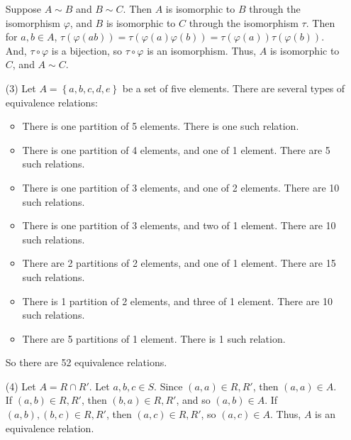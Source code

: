 \documentclass[12pt]{article}
\begin{document}
\begin{itemize}
Suppose $A \sim B$ and $B \sim C$. Then $A$ is isomorphic to $B$ through the isomorphism $\varphi$, and $B$ is isomorphic to $C$ through the isomorphism $\tau$. Then for $a, b \in A$, $\tau(\varphi(ab)) = \tau(\varphi(a)\varphi(b)) = \tau(\varphi(a))\tau(\varphi(b))$. And, $\tau \circ \varphi$ is a bijection, so $\tau \circ \varphi$ is an isomorphism. Thus, $A$ is isomorphic to $C$, and $A \sim C$.
\item[(3)]
Let $A = \left\lbrace a, b, c, d, e \right\rbrace$ be a set of five elements. There are several types of equivalence relations:
\begin{itemize}
\item
There is one partition of 5 elements. There is one such relation.
\item
There is one partition of 4 elements, and one of 1 element. There are 5 such relations.
\item
There is one partition of 3 elements, and one of 2 elements. There are 10 such relations.
\item
There is one partition of 3 elements, and two of 1 element. There are 10 such relations.
\item
There are 2 partitions of 2 elements, and one of 1 element. There are 15 such relations.
\item
There is 1 partition of 2 elements, and three of 1 element. There are 10 such relations.
\item
There are 5 partitions of 1 element. There is 1 such relation.
\end{itemize}
So there are 52 equivalence relations.
\item[(4)]
Let $A = R \cap R'$. Let $a, b, c \in S$. Since $(a, a) \in R, R'$, then $(a, a) \in A$. If $(a, b) \in R, R'$, then $(b, a) \in R, R'$, and so $(a, b) \in A$. If $(a, b), (b, c) \in R, R'$, then $(a, c) \in R, R'$, so $(a, c) \in A$. Thus, $A$ is an equivalence relation.


\end{itemize}
\end{document}
